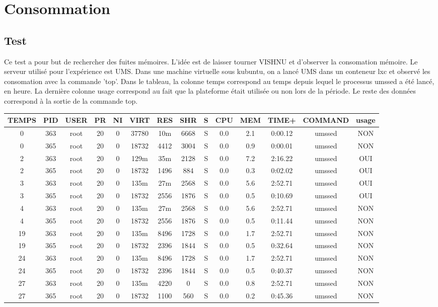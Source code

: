 \documentclass{article}
\begin{document}
\section{Consommation}

\subsection{Test}
Ce test a pour but de rechercher des fuites mémoires. L'idée est de laisser
tourner VISHNU et d'observer la consomation mémoire. Le serveur utilisé pour
l'expérience est UMS. Dans une machine virtuelle sous kubuntu, on a lancé
UMS dans un conteneur lxc et observé les consomation avec la commande 'top'. Dans le tableau, la colonne temps correspond au temps depuis lequel 
le processus umssed a été lancé, en heure. La dernière colonne usage 
correspond au fait que la plateforme était utilisée ou non lors de la
période. Le reste des données correspond à la sortie de la commande top.

\begin{tabular}{|c|c|c|c|c|c|c|c|c|c|c|c|c|c|}
\hline
TEMPS & PID & USER & PR & NI & VIRT & RES & SHR & S & CPU & MEM & TIME+ & COMMAND & usage \\
\hline
0 & 363 & root & 20 & 0 & 37780 & 10m & 6668 & S & 0.0 & 2.1 & 0:00.12 & umssed & NON \\                      
0 & 365 & root & 20 & 0 & 18732 & 4412 & 3004 & S & 0.0 & 0.9 & 0:00.01 & umssed  & NON \\
\hline
2 & 363 & root & 20 & 0 & 129m & 35m & 2128 & S & 0.0 & 7.2 & 2:16.22 & umssed & OUI\\
2 & 365 & root & 20 & 0 & 18732 & 1496 & 884 & S & 0.0 & 0.3 & 0:02.02 & umssed & OUI \\
\hline
3 & 363 & root & 20 & 0 & 135m & 27m & 2568 & S & 0.0 & 5.6 & 2:52.71 & umssed & OUI \\
3 & 365 & root & 20 & 0 & 18732 & 2556 & 1876 & S & 0.0 & 0.5 & 0:10.69 & umssed & OUI \\
\hline
4 & 363 & root & 20 & 0 & 135m & 27m & 2568 & S & 0.0 & 5.6 & 2:52.71 & umssed & NON \\
4 & 365 & root & 20 & 0 & 18732 & 2556 & 1876 & S & 0.0 & 0.5 & 0:11.44 & umssed & NON \\
\hline
19 & 363 & root & 20 & 0 & 135m & 8496 & 1728 & S & 0.0 & 1.7 & 2:52.71 & umssed & NON \\
19 & 365 & root & 20 & 0 & 18732 & 2396 & 1844 & S & 0.0 & 0.5 & 0:32.64 & umssed & NON\\
\hline
24 & 363 & root & 20 & 0 & 135m & 8496 & 1728 & S & 0.0 & 1.7 & 2:52.71 & umssed & NON \\
24 & 365 & root & 20 & 0 & 18732 & 2396 & 1844 & S & 0.0 & 0.5 & 0:40.37 & umssed & NON \\
\hline
27 & 363 & root & 20 & 0 & 135m & 4220 & 0 & S & 0.0 & 0.8 & 2:52.71 & umssed & NON \\
27 & 365 & root & 20 & 0 & 18732 & 1100 & 560 & S & 0.0 & 0.2 & 0:45.36 & umssed & NON \\
\hline
\end{tabular}
\end{document}

